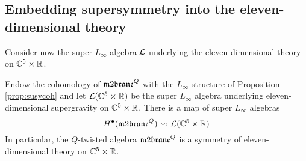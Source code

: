 \subsection{Embedding supersymmetry into the eleven-dimensional theory} \label{s:residual}

Consider now the super $L_\infty$ algebra $\mathcal L$ underlying the eleven-dimensional theory on $\mathbb C^5 \times \mathbb R$. 

\begin{prop}
Endow the cohomology of $\m2^Q$ with the $L_\infty$ structure of Proposition \ref{prop:susycoh} and let $\mathcal L(\mathbb C^5 \times \mathbb R)$ be the super $L_\infty$ algebra underlying eleven-dimensional supergravity on $\mathbb C^5 \times \mathbb R$. 
There is a map of super $L_\infty$ algebras 
\[
H^\bu(\m2^Q) \rightsquigarrow \cL (\CC^5 \times \RR)
\]
In particular, the $Q$-twisted algebra $\m2^Q$ is a symmetry of eleven-dimensional theory on $\mathbb C^5 \times \mathbb R$. 
\end{prop}
